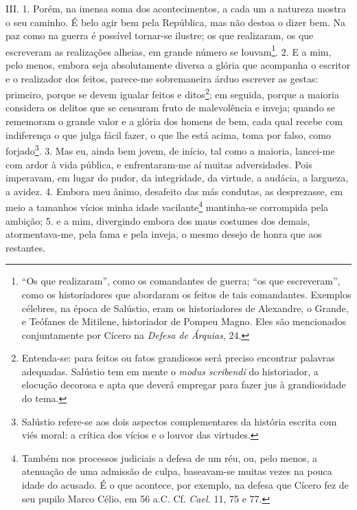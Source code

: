 III. 1. Porém, na imensa soma dos acontecimentos, a cada um a natureza mostra o
seu caminho. É belo agir bem pela República, mas não destoa o dizer bem. Na paz
como na guerra é possível tornar-se ilustre; os que realizaram, os que
escreveram as realizações alheias, em grande número se louvam\footnote{``Os que
realizaram'', como os comandantes de guerra; ``os que escreveram'', como os
historiadores que abordaram os feitos de tais comandantes. Exemplos célebres,
na época de Salústio, eram os historiadores de Alexandre, o Grande, e Teófanes
de Mitilene, historiador de Pompeu Magno. Eles são mencionados conjuntamente
por Cícero na \emph{Defesa de Árquias}, 24.}. 2. E a mim, pelo menos, embora
seja absolutamente diversa a glória que acompanha o escritor e o realizador dos
feitos, parece-me sobremaneira árduo escrever as gestas: primeiro, porque se
devem igualar feitos e ditos\footnote{Entenda-se: para feitos ou fatos
grandiosos será preciso encontrar palavras adequadas. Salústio tem em mente o
\emph{modus scribendi} do historiador, a elocução decorosa e apta que deverá
empregar para fazer jus à grandiosidade do tema.}; em seguida, porque a maioria
considera os delitos que se censuram fruto de malevolência e inveja; quando se
rememoram o grande valor e a glória dos homens de bem, cada qual recebe com
indiferença o que julga fácil fazer, o que lhe está acima, toma por falso, como
forjado\footnote{Salústio refere-se aos dois aspectos complementares da
história escrita com viés moral: a crítica dos vícios e o louvor das
virtudes.}. 3. Mas eu, ainda bem jovem, de início, tal como a maioria,
lancei-me com ardor à vida pública, e enfrentaram-me aí muitas adversidades.
Pois imperavam, em lugar do pudor, da integridade, da virtude, a audácia, a
largueza, a avidez. 4. Embora meu ânimo, desafeito das más condutas, as
desprezasse, em meio a tamanhos vícios minha idade vacilante\footnote{Também
nos processos judiciais a defesa de um réu, ou, pelo menos, a atenuação de uma
admissão de culpa, baseavam-se muitas vezes na pouca idade do acusado. É o que
acontece, por exemplo, na defesa que Cícero fez de seu pupilo Marco Célio, em
56 a.C. Cf. \emph{Cael.} 11, 75 e 77.} mantinha-se corrompida pela ambição; 5. e a mim, divergindo embora dos
maus costumes dos demais, atormentava-me, pela fama e pela inveja, o mesmo
desejo de honra que aos restantes.

